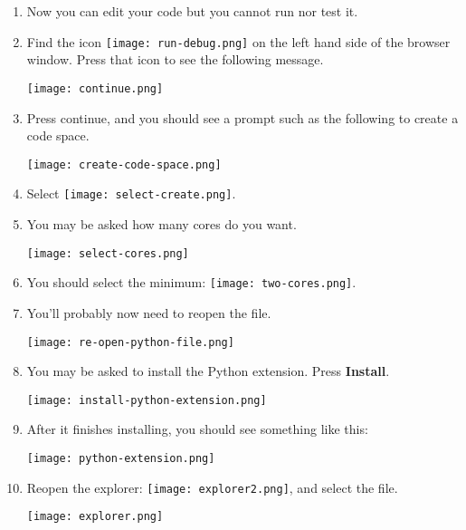 \begin{enumerate}

\item Now you can edit your code but you cannot run nor test it.

\item Find the icon \texttt{[image: run-debug.png]} on the
  left hand side of the browser window.  Press that icon to see the
  following message.

\nopagebreak
\noindent\texttt{[image: continue.png]}

\item Press continue, and you should see a prompt such as the
  following to create a code space.

\nopagebreak
\noindent\texttt{[image: create-code-space.png]}

\item Select \texttt{[image: select-create.png]}.

\item You may be asked how many cores do you want.

\nopagebreak
\noindent\texttt{[image: select-cores.png]}

\item You should select the minimum: \texttt{[image: two-cores.png]}.

\item You'll probably now need to reopen the  file.

\nopagebreak
\noindent\texttt{[image: re-open-python-file.png]}

\item You may be asked to install the Python extension.  Press \textbf{Install}.

\nopagebreak
\noindent\texttt{[image: install-python-extension.png]}

  

\item After it finishes installing,   you should see something like this:

\nopagebreak
\noindent\texttt{[image: python-extension.png]}

\item Reopen the explorer: \texttt{[image: explorer2.png]},
  and select the  file.

\nopagebreak
\noindent\texttt{[image: explorer.png]}
\end{enumerate}

\clearpage


